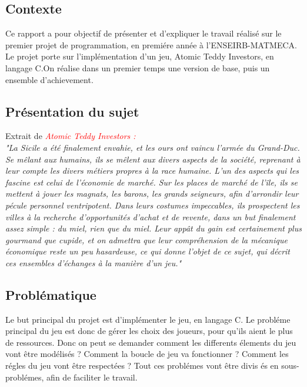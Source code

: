 \documentclass{article}
\begin{document}
\subsection{Contexte}
Ce rapport a pour objectif de pr\'esenter et d'expliquer le travail r\'ealis\'e sur le premier projet de programmation, en premi\'ere ann\'ee \`a l'ENSEIRB-MATMECA.
Le projet porte sur l'impl\'ementation d'un jeu, Atomic Teddy Investors, en langage C.On r\'ealise dans un premier temps une version de base, puis un ensemble d'achievement.

\subsection{Pr\'esentation du sujet}

Extrait de \textcolor{red}{\textit{Atomic Teddy Investors :}}\\ 

\textit{"La Sicile a \'et\'e finalement envahie, et les ours ont vaincu l'arm\'ee du Grand-Duc. Se m\^elant aux humains, ils se m\^elent aux divers aspects de la soci\'et\'e, 
reprenant \`a leur compte les divers m\'etiers propres \`a la race humaine. L'un des aspects qui les fascine est celui de l'\'economie de march\'e. Sur les places de 
march\'e de l'\^ile, ils se mettent \`a jouer les magnats, les barons, les grands seigneurs, afin d'arrondir leur p\'ecule personnel ventripotent. Dans leurs costumes 
impeccables, ils prospectent les villes \`a la recherche d'opportunit\'es d'achat et de revente, dans un but finalement assez simple : du miel, rien que du miel. 
Leur app\^at du gain est certainement plus gourmand que cupide, et on admettra que leur compr\'ehension de la m\'ecanique \'economique reste un peu hasardeuse, ce qui 
donne l'objet de ce sujet, qui d\'ecrit ces ensembles d'\'echanges \`a la mani\`ere d'un jeu."}


\subsection{Probl\'ematique}

Le but principal du projet est d'impl\'ementer le jeu, en langage C. Le probl\'eme principal du jeu est donc de g\'erer les choix des joueurs, pour qu'ils aient le plus de ressources. Donc on peut se demander comment les differents \'elements du jeu  vont \^etre mod\'elis\'es ?
Comment la boucle de jeu va fonctionner ? Comment les r\'egles du jeu vont \^etre respect\'ees ?
Tout ces probl\'emes vont \^etre divis \'es en sous-probl\'emes, afin de faciliter le travail. 
\end{document}
